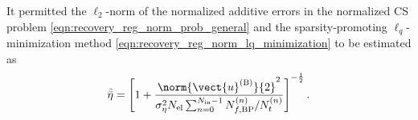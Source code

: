 It permitted
the $\ell_{2}$-norm of
the normalized additive errors in
the normalized \ac{CS} problem
\eqref{eqn:recovery_reg_norm_prob_general} and
the sparsity-promoting $\ell_{q}$-minimization method
\eqref{eqn:recovery_reg_norm_lq_minimization} to be estimated as
\begin{equation}
  \hat{ \bar{\eta} }
  =
  \left[
    1
    +
    \frac{
      \norm{ \vect{u}^{(\text{B})} }{2}^{2}
    }{
      \sigma_{\eta}^{2}
      N_{\text{el}}
      \sum_{ n = 0 }^{ N_{\text{in}} - 1 }
        N_{f, \text{BP}}^{(n)} / N_{t}^{(n)}
    }
  \right]^{ - \frac{1}{2} }.
 \label{eqn:imp_data_acq_rel_obs_error_est}
\end{equation}
